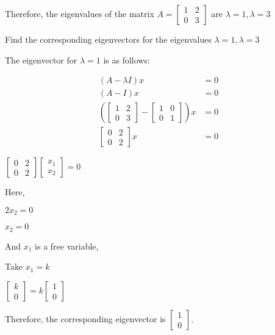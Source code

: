 \documentclass{article}
\begin{document}
Therefore, the eigenvalues of the matrix $A=\left[\begin{array}{ll}1 & 2 \\ 0 & 3\end{array}\right]$ are $\lambda=1, \lambda=3$

Find the corresponding eigenvectors for the eigenvalues $\lambda=1, \lambda=3$

The eigenvector for $\lambda=1$ is as follows:

$$
\begin{aligned}
(A-\lambda I) x & =0 \\
(A-I) x & =0 \\
\left(\left[\begin{array}{ll}
1 & 2 \\
0 & 3
\end{array}\right]-\left[\begin{array}{ll}
1 & 0 \\
0 & 1
\end{array}\right]\right) x & =0 \\
{\left[\begin{array}{ll}
0 & 2 \\
0 & 2
\end{array}\right] x } & =0
\end{aligned}
$$

$\left[\begin{array}{ll}0 & 2 \\ 0 & 2\end{array}\right]\left[\begin{array}{l}x_{1} \\ x_{2}\end{array}\right]=0$

Here,

$2 x_{2}=0$

$x_{2}=0$

And $x_{1}$ is a free variable,

Take $x_{1}=k$

$\left[\begin{array}{l}k \\ 0\end{array}\right]=k\left[\begin{array}{l}1 \\ 0\end{array}\right]$

Therefore, the corresponding eigenvector is $\left[\begin{array}{l}1 \\ 0\end{array}\right]$.
\end{document}
